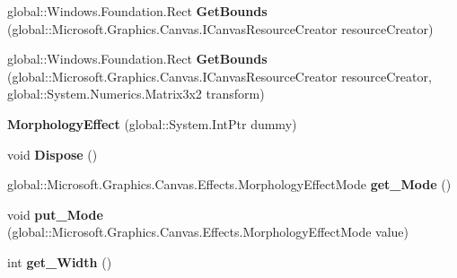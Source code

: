 \begin{DoxyCompactItemize}
global\+::\+Windows.\+Foundation.\+Rect {\bfseries Get\+Bounds} (global\+::\+Microsoft.\+Graphics.\+Canvas.\+I\+Canvas\+Resource\+Creator resource\+Creator)
\item 
\mbox{\label{class_microsoft_1_1_graphics_1_1_canvas_1_1_effects_1_1_morphology_effect_af73df5ff1be6441e88acfd8ace44c35a}} 
global\+::\+Windows.\+Foundation.\+Rect {\bfseries Get\+Bounds} (global\+::\+Microsoft.\+Graphics.\+Canvas.\+I\+Canvas\+Resource\+Creator resource\+Creator, global\+::\+System.\+Numerics.\+Matrix3x2 transform)
\item 
\mbox{\label{class_microsoft_1_1_graphics_1_1_canvas_1_1_effects_1_1_morphology_effect_a2d9ece50b1dd157dfb4ba3fd5a775b2b}} 
{\bfseries Morphology\+Effect} (global\+::\+System.\+Int\+Ptr dummy)
\item 
\mbox{\label{class_microsoft_1_1_graphics_1_1_canvas_1_1_effects_1_1_morphology_effect_a53c33ad9e69a2a3019abd0f92a5654ba}} 
void {\bfseries Dispose} ()
\item 
\mbox{\label{class_microsoft_1_1_graphics_1_1_canvas_1_1_effects_1_1_morphology_effect_abdb13862f058bf5f7dade04433564b08}} 
global\+::\+Microsoft.\+Graphics.\+Canvas.\+Effects.\+Morphology\+Effect\+Mode {\bfseries get\+\_\+\+Mode} ()
\item 
\mbox{\label{class_microsoft_1_1_graphics_1_1_canvas_1_1_effects_1_1_morphology_effect_a296213a0672d2738d42d1fa293d9dd00}} 
void {\bfseries put\+\_\+\+Mode} (global\+::\+Microsoft.\+Graphics.\+Canvas.\+Effects.\+Morphology\+Effect\+Mode value)
\item 
\mbox{\label{class_microsoft_1_1_graphics_1_1_canvas_1_1_effects_1_1_morphology_effect_a6f97be0b87a082ba8cb4b9ebc4f89d70}} 
int {\bfseries get\+\_\+\+Width} ()
\item 
\mbox{\label{class_microsoft_1_1_graphics_1_1_canvas_1_1_effects_1_1_morphology_effect_ac3f128cf3f9dcffa2e7ed06b0a827404}} 

\end{DoxyCompactItemize}
